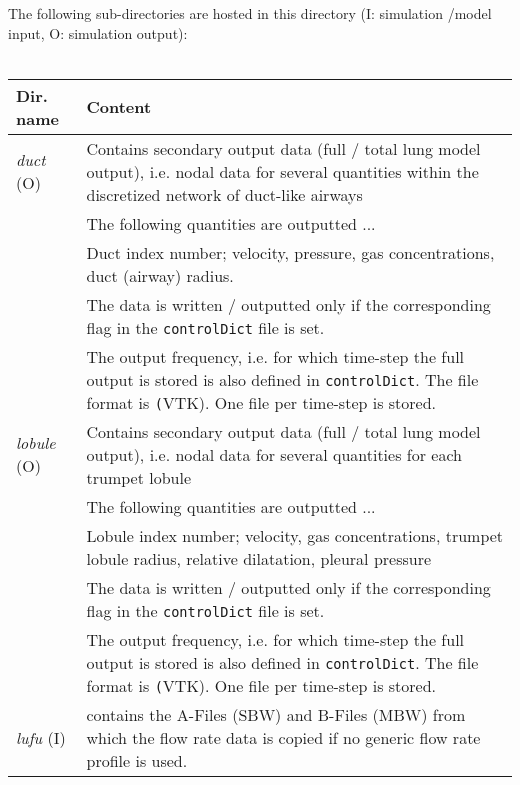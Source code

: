 The following sub-directories are hosted in this directory (I: simulation /model input, O: simulation output):
\\ \\
\begin{tabular}{L{0.25\textwidth} L{0.75\textwidth}}
  \toprule
  Dir. name      & Content \\
  \midrule
  \textit{duct} (O) & Contains secondary output data (full / total lung model output), i.e. nodal data for several quantities within the discretized network of duct-like airways \\
                 & The following quantities are outputted ... \\
                 & Duct index number; velocity, pressure, gas concentrations, duct (airway) radius. \\
                 & The data is written / outputted only if the corresponding flag in the \texttt{controlDict} file is set. \\
                 & The output frequency, i.e. for which time-step the full output is stored is also defined in \texttt{controlDict}. The file format is \texttt(VTK). One file per time-step is stored. \\
  \midrule
  \textit{lobule} (O) & Contains secondary output data (full / total lung model output), i.e. nodal data for several quantities for each trumpet lobule \\
                 & The following quantities are outputted ... \\
                 & Lobule index number; velocity, gas concentrations, trumpet lobule radius, relative dilatation, pleural pressure \\
                 & The data is written / outputted only if the corresponding flag in the \texttt{controlDict} file is set. \\
                 & The output frequency, i.e. for which time-step the full output is stored is also defined in \texttt{controlDict}. The file format is \texttt(VTK). One file per time-step is stored. \\
  \midrule
  \textit{lufu} (I) & contains the A-Files (SBW) and B-Files (MBW) from which the flow rate data is copied if no generic flow rate profile is used. \\
  \bottomrule
\end{tabular}

\clearpage

